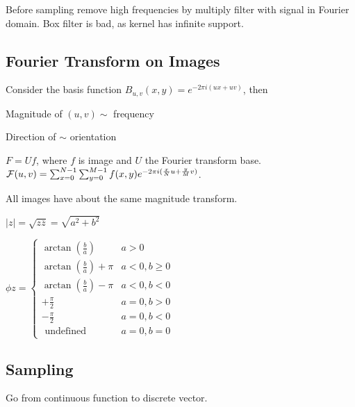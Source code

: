\begin{definition}[Smoothing]
  Before sampling remove high frequencies by multiply filter with signal in Fourier domain.
  Box filter is bad, as kernel has infinite support.
\end{definition}

\subsection{Fourier Transform on Images}

Consider the basis function \(B_{u,v}(x, y) = e^{-2\pi i(ux + uv)}\), then

\begin{itemize*}
  \item Magnitude of \((u, v) \sim\) frequency
  \item Direction of \(\sim\) orientation
\end{itemize*}

\begin{definition}[FT on Images]
 \(F = Uf\), where \(f\) is image and \(U\) the Fourier transform base.
 \(\operatorname{\mathcal{F}}(u,v) = \sum_{x = 0}^{N - 1}\sum_{y = 0}^{M - 1} f(x, y) e^{-2\pi i (\frac{x}{N}u + \frac{y}{M}v)}\).
\end{definition}

\begin{theorem}
  All images have about the same magnitude transform.
\end{theorem}

\begin{definition}[Magnitude of \(z \in \C\)]
  \(|z| = \sqrt{z \overline{z}} = \sqrt{a^2 + b^2}\)
\end{definition}

\begin{definition}[Phase of \(z \in \C\)]
  \(\phi{z} =\left\{\begin{array}{ll}\arctan \left(\frac{b}{a}\right) & a>0 \\ \arctan \left(\frac{b}{a}\right)+\pi & a<0, b \geq 0 \\ \arctan \left(\frac{b}{a}\right)-\pi & a<0, b<0 \\ +\frac{\pi}{2} & a=0, b>0 \\ -\frac{\pi}{2} & a=0, b<0 \\ \text { undefined } & a=0, b=0\end{array}\right.\)
\end{definition}

\subsection{Sampling}
Go from continuous function to discrete vector.

